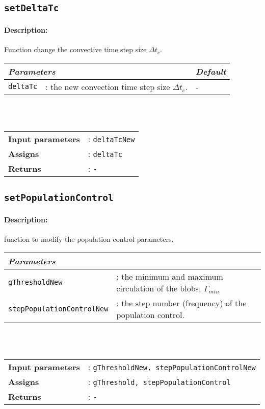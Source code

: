 \subsection{\texttt{setDeltaTc}}
	\paragraph{Description:} Function change the convective time step size $\Delta t_c$.\\
	
	 \begin{tabular}{p{3.5cm}p{10cm}p{1cm}}
				\multicolumn{2}{l}{\textit{Parameters}} & \textit{Default} \\ \hline
		   		\texttt{deltaTc} &: the new convection time step size $\Delta t_c$. & - \\
		\end{tabular} \vspace{5 mm}\\
	\\		
	\begin{tabular}{lp{10cm}}
		\textbf{Input parameters} &: \texttt{deltaTcNew}\\
		\textbf{Assigns} &:  \texttt{deltaTc}\\
		\textbf{Returns} &: \texttt{-}\\
	\end{tabular}

\subsection{\texttt{setPopulationControl}}
	\paragraph{Description:} function to modify the population control parameters.\\
	
	 \begin{tabular}{lp{10cm}}
				\textit{Parameters} & \\ \hline
		   		\texttt{gThresholdNew} &: the minimum and maximum circulation of the blobs, $\Gamma_{min}$\\
		   		\texttt{stepPopulationControlNew} &: the step number (frequency) of the population control.\\
		\end{tabular} \vspace{5 mm}\\
	\\		
	\begin{tabular}{lp{10cm}}
		\textbf{Input parameters} &: \texttt{gThresholdNew, stepPopulationControlNew}\\
		\textbf{Assigns} &:  \texttt{gThreshold, stepPopulationControl}\\
		\textbf{Returns} &: \texttt{-}\\
	\end{tabular}

